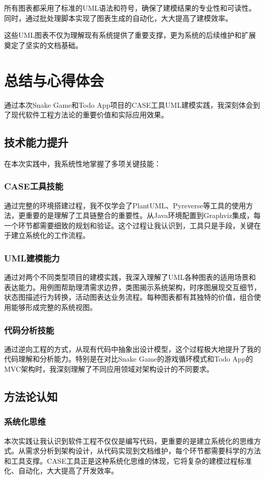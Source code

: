 \documentclass[a4paper]{article}
\begin{document}
所有图表都采用了标准的UML语法和符号，确保了建模结果的专业性和可读性。同时，通过批处理脚本实现了图表生成的自动化，大大提高了建模效率。

这些UML图表不仅为理解现有系统提供了重要支撑，更为系统的后续维护和扩展奠定了坚实的文档基础。

\section{总结与心得体会}

通过本次Snake Game和Todo App项目的CASE工具UML建模实践，我深刻体会到了现代软件工程方法论的重要价值和实际应用效果。

\subsection{技术能力提升}

在本次实践中，我系统性地掌握了多项关键技能：

\subsubsection{CASE工具技能}
通过完整的环境搭建过程，我不仅学会了PlantUML、Pyreverse等工具的使用方法，更重要的是理解了工具链整合的重要性。从Java环境配置到Graphviz集成，每一个环节都需要细致的规划和验证。这个过程让我认识到，工具只是手段，关键在于建立系统化的工作流程。

\subsubsection{UML建模能力}
通过对两个不同类型项目的建模实践，我深入理解了UML各种图表的适用场景和表达能力。用例图帮助理清需求边界，类图揭示系统架构，时序图展现交互细节，状态图描述行为转换，活动图表达业务流程。每种图表都有其独特的价值，组合使用能够形成完整的系统视图。

\subsubsection{代码分析技能}
通过逆向工程的方式，从现有代码中抽象出设计模型，这个过程极大地提升了我的代码理解和分析能力。特别是在对比Snake Game的游戏循环模式和Todo App的MVC架构时，我深刻理解了不同应用领域对架构设计的不同要求。

\subsection{方法论认知}

\subsubsection{系统化思维}
本次实践让我认识到软件工程不仅仅是编写代码，更重要的是建立系统化的思维方式。从需求分析到架构设计，从代码实现到文档维护，每个环节都需要科学的方法和工具支撑。CASE工具正是这种系统化思维的体现，它将复杂的建模过程标准化、自动化，大大提高了开发效率。
\end{document}
